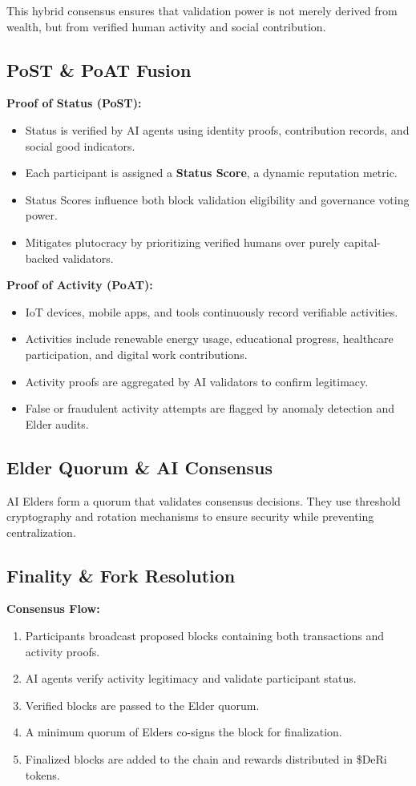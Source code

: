 \documentclass[11pt,a4paper]{article}
\begin{document}
This hybrid consensus ensures that validation power is not merely derived from wealth, but from verified human activity and social contribution.

\subsection{PoST \& PoAT Fusion}
\textbf{Proof of Status (PoST):}
\begin{itemize}
    \item Status is verified by AI agents using identity proofs, contribution records, and social good indicators.
    \item Each participant is assigned a \textbf{Status Score}, a dynamic reputation metric.
    \item Status Scores influence both block validation eligibility and governance voting power.
    \item Mitigates plutocracy by prioritizing verified humans over purely capital-backed validators.
\end{itemize}

\textbf{Proof of Activity (PoAT):}
\begin{itemize}
    \item IoT devices, mobile apps, and tools continuously record verifiable activities.
    \item Activities include renewable energy usage, educational progress, healthcare participation, and digital work contributions.
    \item Activity proofs are aggregated by AI validators to confirm legitimacy.
    \item False or fraudulent activity attempts are flagged by anomaly detection and Elder audits.
\end{itemize}

\subsection{Elder Quorum \& AI Consensus}
AI Elders form a quorum that validates consensus decisions. They use threshold cryptography and rotation mechanisms to ensure security while preventing centralization.

\subsection{Finality \& Fork Resolution}
\textbf{Consensus Flow:}
\begin{enumerate}
    \item Participants broadcast proposed blocks containing both transactions and activity proofs.
    \item AI agents verify activity legitimacy and validate participant status.
    \item Verified blocks are passed to the Elder quorum.
    \item A minimum quorum of Elders co-signs the block for finalization.
    \item Finalized blocks are added to the chain and rewards distributed in \$DeRi tokens.
\end{enumerate}
\end{document}
